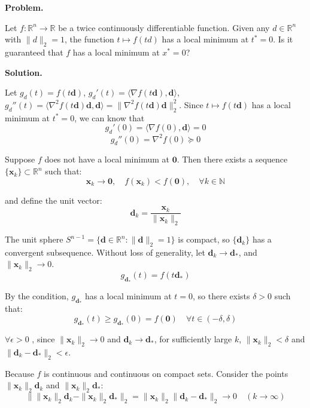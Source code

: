 \documentclass[12pt, a4paper, oneside]{ctexart}
\newcounter{problemname}
\newenvironment{problem}{\begin{shaded}\stepcounter{problemname}\par\noindent\textbf{Problem\arabic{problemname}. }}{\end{shaded}\par}
\newenvironment{solution}{\par\noindent\textbf{Solution. }}{\par}
\begin{document}
\begin{problem}
	
\noindent Let $ f:\mathbb{R}^n \to \mathbb{R} $ be a twice continuously differentiable function. Given any $ d \in \mathbb{R}^n $ with $ \|d\|_2 = 1 $, the function $ t \mapsto f(td) $ has a local minimum at $ t^* = 0 $. Is it guaranteed that $ f $ has a local minimum at $ x^* = 0 $?
	
\end{problem}

\begin{solution}
	
Let $g_d(t) = f(t\mathbf{d})$, $g_d'(t) = \langle \nabla f(t\mathbf{d}), \mathbf{d} \rangle$, $g_d''(t) = \langle \nabla^2 f(t\mathbf{d})\mathbf{d}, \mathbf{d} \rangle = \|\nabla^2 f(t\mathbf{d})\mathbf{d}\|_2^2$. Since $t \mapsto f(t\mathbf{d})$ has a local minimum at $t^* = 0$, we can know that
$$
g_d'(0) = \langle \nabla f(0), \mathbf{d} \rangle = 0
$$
$$
g_d''(0) = \nabla^2 f(0) \succeq 0
$$

Suppose $ f $ does not have a local minimum at $ \mathbf{0} $. Then there exists a sequence $ \{\mathbf{x}_k\} \subset \mathbb{R}^n $ such that:  
$$
\mathbf{x}_k \to \mathbf{0}, \quad f(\mathbf{x}_k) < f(\mathbf{0}), \quad \forall k \in \mathbb{N}
$$  

and define the unit vector:  
$$
\mathbf{d}_k = \frac{\mathbf{x}_k}{\|\mathbf{x}_k\|_2}
$$  

The unit sphere $ S^{n - 1} = \{\mathbf{d} \in \mathbb{R}^n : \|\mathbf{d}\|_2 = 1\} $ is compact, so $ \{\mathbf{d}_k\} $ has a convergent subsequence. Without loss of generality, let $ \mathbf{d}_k \to \mathbf{d}_* $, and $ \|\mathbf{x}_k\|_2 \to 0 $.  
$$
g_{\mathbf{d}_*}(t) = f(t\mathbf{d}_*)
$$  

By the condition, $ g_{\mathbf{d}_*} $ has a local minimum at $ t = 0 $, so there exists $ \delta > 0 $ such that:  
$$g_{\mathbf{d}_*}(t) \geq g_{\mathbf{d}_*}(0) = f(\mathbf{0}) \quad \forall t \in (-\delta, \delta)
$$  

$ \forall \epsilon>0 $ , since $ \|\mathbf{x}_k\|_2 \to 0 $ and $ \mathbf{d}_k \to \mathbf{d}_* $, for sufficiently large $ k $, $ \|\mathbf{x}_k\|_2 < \delta $ and $ \|\mathbf{d}_k - \mathbf{d}_*\|_2 < \epsilon $. 

Because $ f $ is continuous and  continuous on compact sets. Consider the points $ \|\mathbf{x}_k\|_2 \mathbf{d}_k $ and $ \|\mathbf{x}_k\|_2 \mathbf{d}_* $:  
$$
\|\|\mathbf{x}_k\|_2 \mathbf{d}_k - \|\mathbf{x}_k\|_2 \mathbf{d}_*\|_2 = \|\mathbf{x}_k\|_2 \|\mathbf{d}_k - \mathbf{d}_*\|_2 \to 0 \quad (k \to \infty)
$$  


\end{solution}
\end{document}
